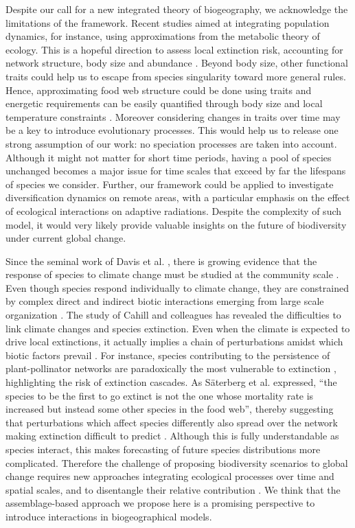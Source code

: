 Despite our call for a new integrated theory of biogeography, we acknowledge the limitations of the framework. Recent studies aimed at integrating population dynamics, for instance, using approximations from the metabolic theory of ecology. This is a hopeful direction to assess local extinction risk, accounting for network structure, body size and abundance \citep{Schneider2012}. Beyond body size, other functional traits \citep{McGill2006} could help us to escape from species singularity toward more general rules. Hence, approximating food web structure could be done using traits \citep{Gravel2013} and energetic requirements can be easily quantified through body size and local temperature constraints \citep{Brown2004}. Moreover considering changes in traits over time may be a key to introduce evolutionary processes. This would help us to release one strong assumption of our work: no speciation processes are taken into account. Although it might not matter for short time periods, having a pool of species unchanged becomes a major issue for time scales that exceed by far the lifespans of species we consider. Further, our framework could be applied to investigate diversification dynamics on remote areas, with a particular emphasis on the effect of ecological interactions on adaptive radiations. Despite the complexity of such model, it would very likely provide valuable insights on the future of biodiversity under current global change.

Since the seminal work of Davis et al. \citep{Davis1998}, there is growing evidence that the response of species to climate change must be studied at the community scale \citep{Suttle2007}. Even though species respond individually to climate change, they are constrained by complex direct and indirect biotic interactions emerging from large scale organization \citep{Lavergne2010}. The study of Cahill and colleagues \citep{Cahill2013} has revealed the difficulties to link climate changes and species extinction. Even when the climate is expected to drive local extinctions, it actually implies a chain of perturbations amidst which biotic factors prevail \citep[\emph{e.g.} loss of prey][]{Durance2010}. For instance, species contributing to the persistence of plant-pollinator networks are paradoxically the most vulnerable to extinction \citep{Saavedra2011}, highlighting the risk of extinction cascades. As S\"aterberg et al. expressed, ``the species to be the first to go extinct is not the one whose mortality rate is increased but instead some other species in the food web'', thereby suggesting that perturbations which affect species differently also spread over the network making extinction difficult to predict \citep{Saterberg2013}. Although this is fully understandable as species interact, this makes forecasting of future species distributions more complicated. Therefore the challenge of proposing biodiversity scenarios to global change requires new approaches integrating ecological processes over time and spatial scales, and to disentangle their relative contribution \citep{Lavergne2010}. We think that the assemblage-based approach we propose here is a promising perspective to introduce interactions in biogeographical models.


